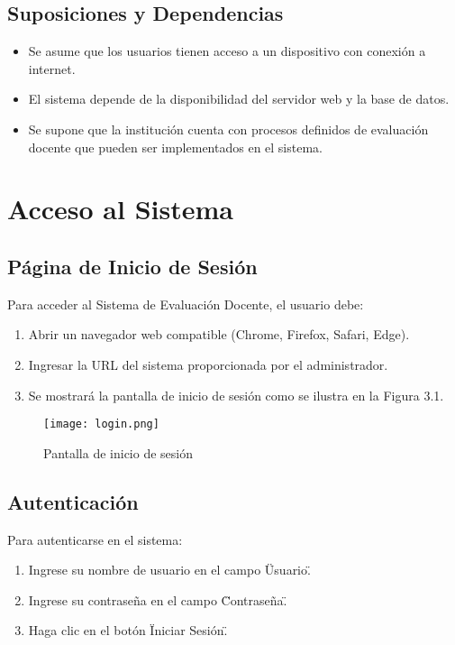 \documentclass[12pt,a4paper]{book}
\begin{document}
\section{Suposiciones y Dependencias}
\begin{itemize}
    \item Se asume que los usuarios tienen acceso a un dispositivo con conexión a internet.
    \item El sistema depende de la disponibilidad del servidor web y la base de datos.
    \item Se supone que la institución cuenta con procesos definidos de evaluación docente que pueden ser implementados en el sistema.
\end{itemize}

\chapter{Acceso al Sistema}
\section{Página de Inicio de Sesión}
Para acceder al Sistema de Evaluación Docente, el usuario debe:

\begin{enumerate}
    \item Abrir un navegador web compatible (Chrome, Firefox, Safari, Edge).
    \item Ingresar la URL del sistema proporcionada por el administrador.
    \item Se mostrará la pantalla de inicio de sesión como se ilustra en la Figura 3.1.
\end{enumerate}

\begin{figure}[H]
    \centering
    \texttt{[image: login.png]}
    \caption{Pantalla de inicio de sesión}
    \label{fig:login}
\end{figure}

\section{Autenticación}
Para autenticarse en el sistema:

\begin{enumerate}
    \item Ingrese su nombre de usuario en el campo \"Usuario\".
    \item Ingrese su contraseña en el campo \"Contraseña\".
    \item Haga clic en el botón \"Iniciar Sesión\".
\end{enumerate}
\end{document}
